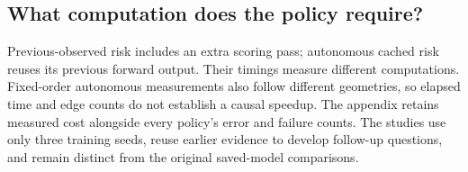 \subsection{What computation does the policy require?}
Previous-observed risk includes an extra scoring pass; autonomous cached risk reuses its previous forward output. Their timings measure different computations. Fixed-order autonomous measurements also follow different geometries, so elapsed time and edge counts do not establish a causal speedup. The appendix retains measured cost alongside every policy's error and failure counts. The studies use only three training seeds, reuse earlier evidence to develop follow-up questions, and remain distinct from the original saved-model comparisons.
